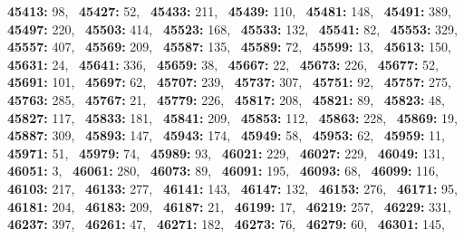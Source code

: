 \textbf{45413:} 98,\allowbreak~ 
\textbf{45427:} 52,\allowbreak~ 
\textbf{45433:} 211,\allowbreak~ 
\textbf{45439:} 110,\allowbreak~ 
\textbf{45481:} 148,\allowbreak~ 
\textbf{45491:} 389,\allowbreak~ 
\textbf{45497:} 220,\allowbreak~ 
\textbf{45503:} 414,\allowbreak~ 
\textbf{45523:} 168,\allowbreak~ 
\textbf{45533:} 132,\allowbreak~ 
\textbf{45541:} 82,\allowbreak~ 
\textbf{45553:} 329,\allowbreak~ 
\textbf{45557:} 407,\allowbreak~ 
\textbf{45569:} 209,\allowbreak~ 
\textbf{45587:} 135,\allowbreak~ 
\textbf{45589:} 72,\allowbreak~ 
\textbf{45599:} 13,\allowbreak~ 
\textbf{45613:} 150,\allowbreak~ 
\textbf{45631:} 24,\allowbreak~ 
\textbf{45641:} 336,\allowbreak~ 
\textbf{45659:} 38,\allowbreak~ 
\textbf{45667:} 22,\allowbreak~ 
\textbf{45673:} 226,\allowbreak~ 
\textbf{45677:} 52,\allowbreak~ 
\textbf{45691:} 101,\allowbreak~ 
\textbf{45697:} 62,\allowbreak~ 
\textbf{45707:} 239,\allowbreak~ 
\textbf{45737:} 307,\allowbreak~ 
\textbf{45751:} 92,\allowbreak~ 
\textbf{45757:} 275,\allowbreak~ 
\textbf{45763:} 285,\allowbreak~ 
\textbf{45767:} 21,\allowbreak~ 
\textbf{45779:} 226,\allowbreak~ 
\textbf{45817:} 208,\allowbreak~ 
\textbf{45821:} 89,\allowbreak~ 
\textbf{45823:} 48,\allowbreak~ 
\textbf{45827:} 117,\allowbreak~ 
\textbf{45833:} 181,\allowbreak~ 
\textbf{45841:} 209,\allowbreak~ 
\textbf{45853:} 112,\allowbreak~ 
\textbf{45863:} 228,\allowbreak~ 
\textbf{45869:} 19,\allowbreak~ 
\textbf{45887:} 309,\allowbreak~ 
\textbf{45893:} 147,\allowbreak~ 
\textbf{45943:} 174,\allowbreak~ 
\textbf{45949:} 58,\allowbreak~ 
\textbf{45953:} 62,\allowbreak~ 
\textbf{45959:} 11,\allowbreak~ 
\textbf{45971:} 51,\allowbreak~ 
\textbf{45979:} 74,\allowbreak~ 
\textbf{45989:} 93,\allowbreak~ 
\textbf{46021:} 229,\allowbreak~ 
\textbf{46027:} 229,\allowbreak~ 
\textbf{46049:} 131,\allowbreak~ 
\textbf{46051:} 3,\allowbreak~ 
\textbf{46061:} 280,\allowbreak~ 
\textbf{46073:} 89,\allowbreak~ 
\textbf{46091:} 195,\allowbreak~ 
\textbf{46093:} 68,\allowbreak~ 
\textbf{46099:} 116,\allowbreak~ 
\textbf{46103:} 217,\allowbreak~ 
\textbf{46133:} 277,\allowbreak~ 
\textbf{46141:} 143,\allowbreak~ 
\textbf{46147:} 132,\allowbreak~ 
\textbf{46153:} 276,\allowbreak~ 
\textbf{46171:} 95,\allowbreak~ 
\textbf{46181:} 204,\allowbreak~ 
\textbf{46183:} 209,\allowbreak~ 
\textbf{46187:} 21,\allowbreak~ 
\textbf{46199:} 17,\allowbreak~ 
\textbf{46219:} 257,\allowbreak~ 
\textbf{46229:} 331,\allowbreak~ 
\textbf{46237:} 397,\allowbreak~ 
\textbf{46261:} 47,\allowbreak~ 
\textbf{46271:} 182,\allowbreak~ 
\textbf{46273:} 76,\allowbreak~ 
\textbf{46279:} 60,\allowbreak~ 
\textbf{46301:} 145,\allowbreak~ 
